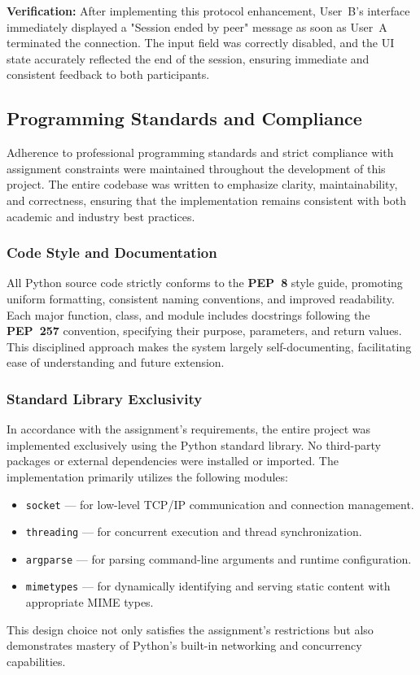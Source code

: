 \noindent\textbf{Verification:}  
After implementing this protocol enhancement, User~B’s interface immediately displayed a "Session ended by peer" message as soon as User~A terminated the connection. 
The input field was correctly disabled, and the UI state accurately reflected the end of the session, ensuring immediate and consistent feedback to both participants.

\subsection{Programming Standards and Compliance}

Adherence to professional programming standards and strict compliance with assignment constraints were maintained throughout the development of this project. 
The entire codebase was written to emphasize clarity, maintainability, and correctness, ensuring that the implementation remains consistent with both academic and industry best practices.

\subsubsection{Code Style and Documentation}
All Python source code strictly conforms to the \textbf{PEP~8} style guide, promoting uniform formatting, consistent naming conventions, and improved readability. 
Each major function, class, and module includes docstrings following the \textbf{PEP~257} convention, specifying their purpose, parameters, and return values. 
This disciplined approach makes the system largely self-documenting, facilitating ease of understanding and future extension.

\subsubsection{Standard Library Exclusivity}
In accordance with the assignment’s requirements, the entire project was implemented exclusively using the Python standard library. 
No third-party packages or external dependencies were installed or imported. 
The implementation primarily utilizes the following modules:
\begin{itemize}
    \item \texttt{socket} --- for low-level TCP/IP communication and connection management.
    \item \texttt{threading} --- for concurrent execution and thread synchronization.
    \item \texttt{argparse} --- for parsing command-line arguments and runtime configuration.
    \item \texttt{mimetypes} --- for dynamically identifying and serving static content with appropriate MIME types.
\end{itemize}
This design choice not only satisfies the assignment’s restrictions but also demonstrates mastery of Python’s built-in networking and concurrency capabilities.

